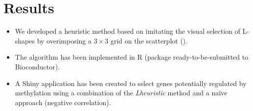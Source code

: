 \section{Results}
\begin{itemize}
	\item We developed a heuristic method based on imitating the visual selection of L-shapes by overimposing a $3\times 3$ grid on the scatterplot (\cite{sanchez:2019}).
	\item The algorithm has been implemented in R (package ready-to-be-submitted to Bioconductor).
	\item A Shiny application has been created to select genes potentially regulated by methylation using a combination of the \textit{Lheuristic} method and a naïve approach (negative correlation).
\end{itemize}
